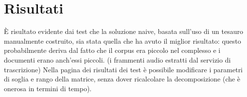     \section{Risultati}
    È risultato evidente dai test che la soluzione naive, basata sull'uso di un tesauro manualmente costruito, sia stata quella che ha avuto il miglior risultato: questo probabilmente deriva dal fatto che il corpus era piccolo nel complesso e i documenti erano anch'essi piccoli. (i frammenti audio estratti dal servizio di trascrizione) Nella pagina dei risultati dei test è possibile modificare i parametri di soglia e rango della matrice,  senza dover ricalcolare la decomposizione (che è onerosa in termini di tempo).

    \FloatBarrier